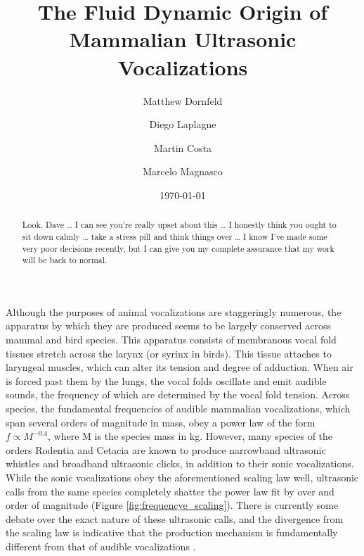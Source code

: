 \documentclass[twocolumn, prl]{revtex4}
\begin{document}
\title{The Fluid Dynamic Origin of Mammalian Ultrasonic Vocalizations}

\author{Matthew Dornfeld}

\author{Diego Laplagne}

\author{Martin Costa} 

\author{Marcelo Magnasco}
\date{\today}
\begin{abstract}
Look, Dave … I can see you’re really upset about this … I honestly think you ought to sit down calmly … take a stress pill and think things over … I know I’ve made some very poor decisions recently, but I can give you my complete assurance that my work will be back to normal.
\end{abstract}
\maketitle
Although the purposes of animal vocalizations are staggeringly numerous, the apparatus by which they are produced seems to be largely conserved across mammal and bird species. This apparatus consists of membranous vocal fold tissues stretch across the larynx (or syrinx in birds). This tissue attaches to laryngeal muscles, which can alter its tension and degree of adduction. When air is forced past them by the lungs, the vocal folds oscillate and emit audible sounds, the frequency of which are determined by the vocal fold tension. Across species, the fundamental frequencies of audible mammalian vocalizations, which span several orders of magnitude in mass, obey a power law of the form $f\propto M^{-0.4}$, where M is the species mass in kg. However, many species of the orders Rodentia and Cetacia are known to produce narrowband ultrasonic whistles and broadband ultrasonic clicks, in addition to their sonic vocalizations. While the sonic vocalizations obey the aforementioned scaling law well, ultrasonic calls from the same species completely shatter the power law fit by over and order of magnitude (Figure \ref{fig:frequencye_scaling}). There is currently some debate over the exact nature of these ultrasonic calls, and the divergence from the scaling law is indicative that the production mechanism is fundamentally different from that of audible vocalizations \cite{Fletcher2010, Berke2010}.
\end{document}

